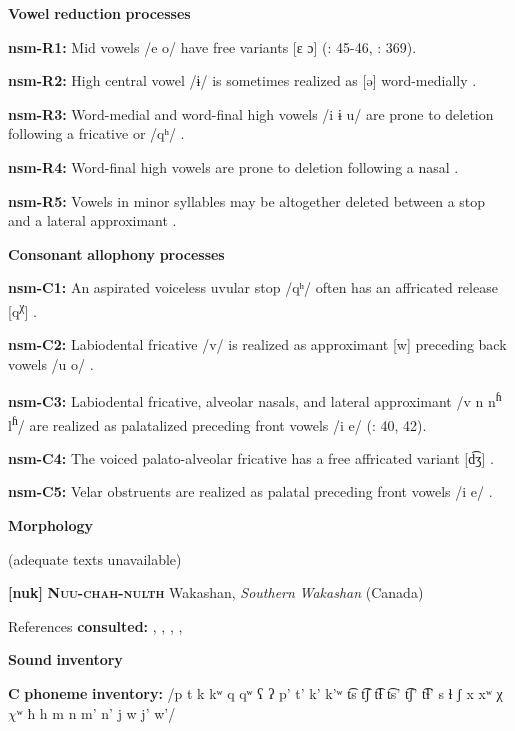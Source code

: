 \begin{styleBody}
\textbf{Vowel} \textbf{reduction} \textbf{processes}

\textbf{nsm-R1:} Mid vowels /e o/ have free variants [ɛ ɔ] (\citealt{Teo2009}: 45-46, \citealt{Teo2012}: 369).

\textbf{nsm-R2:} High central vowel /ɨ/ is sometimes realized as [ə] word-medially \citep[45]{Teo2009}.

\textbf{nsm-R3:} Word-medial and word-final high vowels /i ɨ u/ are prone to deletion following a fricative or /qʰ/ \citep[66]{Teo2009}.

\textbf{nsm-R4:} Word-final high vowels are prone to deletion following a nasal \citep[369]{Teo2012}.

\textbf{nsm-R5:} Vowels in minor syllables may be altogether deleted between a stop and a lateral approximant \citep[370]{Teo2012}.

\textbf{Consonant} \textbf{allophony} \textbf{processes}

\textbf{nsm-C1:} An aspirated voiceless uvular stop /qʰ/ often has an affricated release [q\textsuperscript{χ}] \citep[39]{Teo2009}.

\textbf{nsm-C2:} Labiodental fricative /v/ is realized as approximant [w] preceding back vowels /u o/ \citep[39]{Teo2009}.

\textbf{nsm-C3:} Labiodental fricative, alveolar nasals, and lateral approximant /v n n\textsuperscript{ɦ} l\textsuperscript{ɦ}/ are realized as palatalized preceding front vowels /i e/ (\citealt{Teo2009}: 40, 42).

\textbf{nsm-C4:} The voiced palato-alveolar fricative has a free affricated variant [d͡ʒ] \citep[40]{Teo2009}.

\textbf{nsm-C5:} Velar obstruents are realized as palatal preceding front vowels /i e/ \citep[368]{Teo2012}.

\textbf{Morphology}

(adequate texts unavailable)

\textbf{[nuk]}   \textbf{\textsc{Nuu-chah-nulth}}  Wakashan, \textit{Southern} \textit{Wakashan} (Canada)

References \textbf{consulted:} \citet{CarlsonEtAl2001}, \citet{Davidson2002}, \citet{Kim2003}, \citet{Rose1981}, \citet{Stonham1999}

\textbf{Sound} \textbf{inventory}

\textbf{C} \textbf{phoneme} \textbf{inventory:} /p t k kʷ q qʷ ʕ ʔ p’ t’ k’ k’ʷ t͡s t͡ʃ t͡ɬ t͡s’ t͡ʃ’ t͡ɬ’ s ɬ ʃ x xʷ χ $\chi ʷ$ ħ h m n m’ n’ j w j’ w’/


\end{styleBody}
